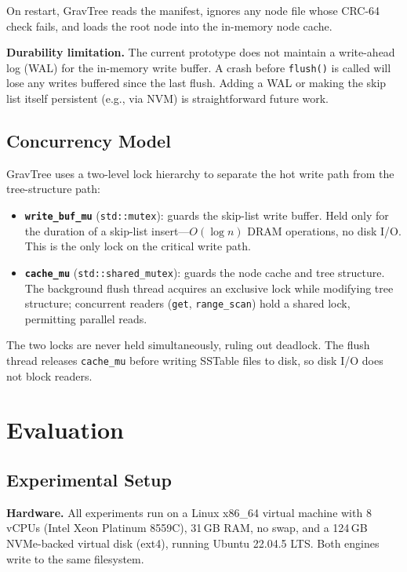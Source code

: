 \documentclass[10pt,twocolumn]{article}
\begin{document}
On restart, GravTree reads the manifest, ignores any node file whose CRC-64
check fails, and loads the root node into the in-memory node cache.

\textbf{Durability limitation.}  The current prototype does not maintain a
write-ahead log (WAL) for the in-memory write buffer.  A crash before
\texttt{flush()} is called will lose any writes buffered since the last flush.
Adding a WAL or making the skip list itself persistent (e.g., via NVM) is
straightforward future work.

\subsection{Concurrency Model}

GravTree uses a two-level lock hierarchy to separate the hot write path from
the tree-structure path:

\begin{itemize}
  \item \textbf{\texttt{write\_buf\_mu}} (\texttt{std::mutex}): guards the
        skip-list write buffer.  Held only for the duration of a skip-list
        insert---$O(\log n)$ DRAM operations, no disk I/O.  This is the only
        lock on the critical write path.
  \item \textbf{\texttt{cache\_mu}} (\texttt{std::shared\_mutex}): guards the
        node cache and tree structure.  The background flush thread acquires
        an exclusive lock while modifying tree structure; concurrent readers
        (\texttt{get}, \texttt{range\_scan}) hold a shared lock, permitting
        parallel reads.
\end{itemize}

The two locks are never held simultaneously, ruling out deadlock.  The flush
thread releases \texttt{cache\_mu} before writing SSTable files to disk, so
disk I/O does not block readers.

\section{Evaluation}
\label{sec:eval}

\subsection{Experimental Setup}

\textbf{Hardware.}  All experiments run on a Linux x86\_64 virtual machine
with 8 vCPUs (Intel Xeon Platinum 8559C), 31\,GB RAM, no swap, and a 124\,GB
NVMe-backed virtual disk (ext4), running Ubuntu 22.04.5 LTS.  Both engines
write to the same filesystem.
\end{document}
